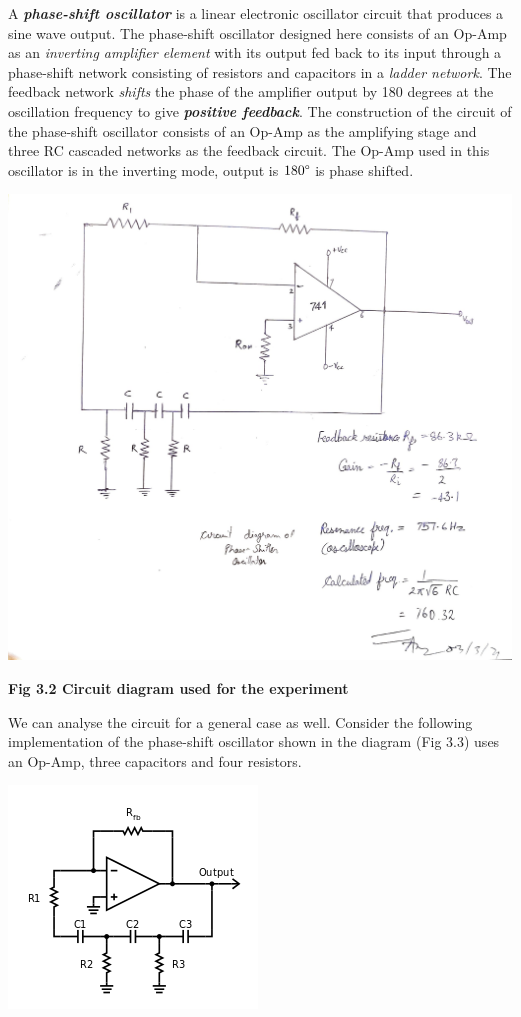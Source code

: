 \bigskip
\par
\noindent
A \textbf{\emph{phase-shift oscillator}} is a linear electronic oscillator circuit that produces a sine wave output. The phase-shift oscillator designed here consists of an Op-Amp as an \emph{inverting amplifier element} with its output fed back to its input through a phase-shift network consisting of resistors and capacitors in a \emph{ladder network}. The feedback network \emph{shifts} the phase of the amplifier output by 180 degrees at the oscillation frequency to give \textbf{\emph{positive feedback}}.
\newline
\noindent
The construction of the circuit of the phase-shift oscillator consists of an Op-Amp as the amplifying stage and three RC cascaded networks as the feedback circuit. The Op-Amp used in this oscillator is in the inverting mode, output is $180 \degree$ is phase shifted.
\begin{center}
    \includegraphics[scale = 0.25]{Documents/pso.jpg}
\end{center}
\begin{center}
    \textbf{Fig 3.2 Circuit diagram used for the experiment}
\end{center}
\noindent We can analyse the circuit for a general case as well. Consider the following implementation of the phase-shift oscillator shown in the diagram (Fig 3.3) uses an Op-Amp, three capacitors and four resistors.
\begin{center}
    \includegraphics[scale = 0.85]{Documents/wikirc.png}
\end{center}
